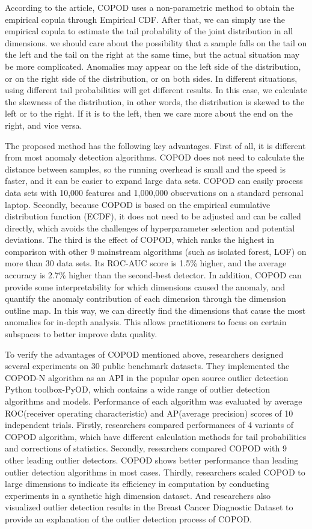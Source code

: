 \documentclass[12pt, a4paper, oneside]{article}
\begin{document}
\par According to the article, COPOD uses a non-parametric method to obtain the empirical copula through Empirical CDF. After that, we can simply use the empirical copula to estimate the tail probability of the joint distribution in all dimensions. we should care about the possibility that a sample falls on the tail on the left and the tail on the right at the same time, but the actual situation may be more complicated. Anomalies may appear on the left side of the distribution, or on the right side of the distribution, or on both sides. In different situations, using different tail probabilities will get different results. In this case, we calculate the skewness of the distribution, in other words, the distribution is skewed to the left or to the right. If it is to the left, then we care more about the end on the right, and vice versa.
\par The proposed method has the following key advantages. First of all, it is different from most anomaly detection algorithms. COPOD does not need to calculate the distance between samples, so the running overhead is small and the speed is faster, and it can be easier to expand large data sets. COPOD can easily process data sets with 10,000 features and 1,000,000 observations on a standard personal laptop. Secondly, because COPOD is based on the empirical cumulative distribution function (ECDF), it does not need to be adjusted and can be called directly, which avoids the challenges of hyperparameter selection and potential deviations. The third is the effect of COPOD, which ranks the highest in comparison with other 9 mainstream algorithms (such as isolated forest, LOF) on more than 30 data sets. Its ROC-AUC score is 1.5\% higher, and the average accuracy is 2.7\% higher than the second-best detector. In addition, COPOD can provide some interpretability for which dimensions caused the anomaly, and quantify the anomaly contribution of each dimension through the dimension outline map. In this way, we can directly find the dimensions that cause the most anomalies for in-depth analysis. This allows practitioners to focus on certain subspaces to better improve data quality.
\par To verify  the advantages of COPOD mentioned above, researchers designed several experiments on 30 public benchmark datasets. They implemented the COPOD-N algorithm as an API in the popular open source outlier detection Python toolbox-PyOD, which contains a wide range of outlier detection algorithms and models.  Performance of each algorithm was evaluated by average ROC(receiver operating characteristic) and AP(average precision) scores of 10 independent trials. Firstly, researchers compared performances of 4 variants of COPOD algorithm, which have different calculation methods for tail probabilities and corrections of statistics. Secondly, researchers compared COPOD with 9 other leading outlier detectors. COPOD shows better performance than leading outlier detection algorithms in most cases.  Thirdly,  researchers scaled COPOD to large dimensions to indicate its efficiency in computation by conducting experiments in a synthetic high dimension dataset. And researchers also visualized outlier detection results in the Breast Cancer Diagnostic Dataset to provide an explanation of the outlier detection process of COPOD. 
\end{document}
